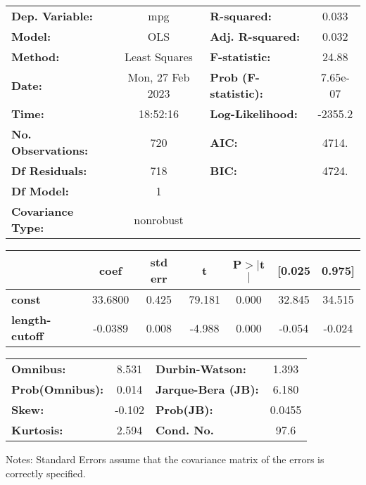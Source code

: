 \begin{center}
\begin{tabular}{lclc}
\toprule
\textbf{Dep. Variable:}    &       mpg        & \textbf{  R-squared:         } &     0.033   \\
\textbf{Model:}            &       OLS        & \textbf{  Adj. R-squared:    } &     0.032   \\
\textbf{Method:}           &  Least Squares   & \textbf{  F-statistic:       } &     24.88   \\
\textbf{Date:}             & Mon, 27 Feb 2023 & \textbf{  Prob (F-statistic):} &  7.65e-07   \\
\textbf{Time:}             &     18:52:16     & \textbf{  Log-Likelihood:    } &   -2355.2   \\
\textbf{No. Observations:} &         720      & \textbf{  AIC:               } &     4714.   \\
\textbf{Df Residuals:}     &         718      & \textbf{  BIC:               } &     4724.   \\
\textbf{Df Model:}         &           1      & \textbf{                     } &             \\
\textbf{Covariance Type:}  &    nonrobust     & \textbf{                     } &             \\
\bottomrule
\end{tabular}
\begin{tabular}{lcccccc}
                       & \textbf{coef} & \textbf{std err} & \textbf{t} & \textbf{P$> |$t$|$} & \textbf{[0.025} & \textbf{0.975]}  \\
\midrule
\textbf{const}         &      33.6800  &        0.425     &    79.181  &         0.000        &       32.845    &       34.515     \\
\textbf{length-cutoff} &      -0.0389  &        0.008     &    -4.988  &         0.000        &       -0.054    &       -0.024     \\
\bottomrule
\end{tabular}
\begin{tabular}{lclc}
\textbf{Omnibus:}       &  8.531 & \textbf{  Durbin-Watson:     } &    1.393  \\
\textbf{Prob(Omnibus):} &  0.014 & \textbf{  Jarque-Bera (JB):  } &    6.180  \\
\textbf{Skew:}          & -0.102 & \textbf{  Prob(JB):          } &   0.0455  \\
\textbf{Kurtosis:}      &  2.594 & \textbf{  Cond. No.          } &     97.6  \\
\bottomrule
\end{tabular}
\end{center}

Notes: \newline
 [1] Standard Errors assume that the covariance matrix of the errors is correctly specified.